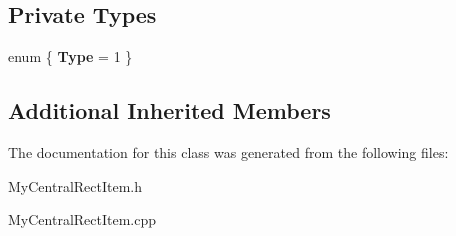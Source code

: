 \subsection*{Private Types}
\begin{DoxyCompactItemize}
\item 
\hypertarget{class_my_central_rect_item_a9ef9aaf375a9e9d809aff54511e926da}{}enum \{ {\bfseries Type} = 1
 \}\label{class_my_central_rect_item_a9ef9aaf375a9e9d809aff54511e926da}

\end{DoxyCompactItemize}
\subsection*{Additional Inherited Members}


The documentation for this class was generated from the following files\+:\begin{DoxyCompactItemize}
\item 
My\+Central\+Rect\+Item.\+h\item 
My\+Central\+Rect\+Item.\+cpp\end{DoxyCompactItemize}
